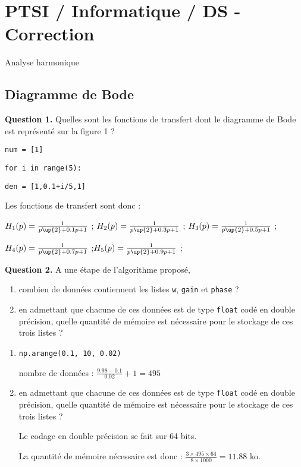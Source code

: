 \documentclass[11pt,fleqn]{book} %
\begin{document}
\chapter{PTSI / Informatique / DS  - Correction}
\begin{center}
\huge{Analyse harmonique}
\end{center}


\section{Diagramme de Bode}

\begin{tBox}
\textbf{Question 1.} Quelles sont les fonctions de transfert dont le diagramme de Bode est représenté sur la figure 1 ?
\end{tBox}

\begin{dBox}
\hspace{0.5 cm} \texttt{num = [1]}

\texttt{for i in range(5):}

\hspace{0.5 cm} \texttt{den = [1,0.1+i/5,1]}
\end{dBox}

Les fonctions de transfert sont donc :

$H_1(p)=\frac{1}{p\up{2}+0.1p+1}$ ; $H_2(p)=\frac{1}{p\up{2}+0.3p+1}$ ; $H_3(p)=\frac{1}{p\up{2}+0.5p+1}$ ;

$H_4(p)=\frac{1}{p\up{2}+0.7p+1}$ ;$H_5(p)=\frac{1}{p\up{2}+0.9p+1}$ ; 


\begin{tBox}
\textbf{Question 2.} A une étape de l'algorithme proposé, 
\begin{enumerate}
\item combien de données contiennent les listes \texttt{w}, \texttt{gain} et \texttt{phase} ?
\item en admettant que chacune de ces données est de type \texttt{float} codé en double précision, quelle quantité de mémoire est nécessaire pour le stockage de ces trois listes ?
\end{enumerate}
\end{tBox}

\begin{enumerate}
\item \texttt{np.arange(0.1, 10, 0.02)}


nombre de données : $\frac{9.98-0.1}{0.02}+1=495$
\item en admettant que chacune de ces données est de type \texttt{float} codé en double précision, quelle quantité de mémoire est nécessaire pour le stockage de ces trois listes ?

Le codage en double précision se fait sur 64 bits.

La quantité de mémoire nécessaire est donc : $\frac{3 \times 495 \times 64}{8 \times 1000} = 11.88$ ko.

\end{enumerate}
\end{document}
